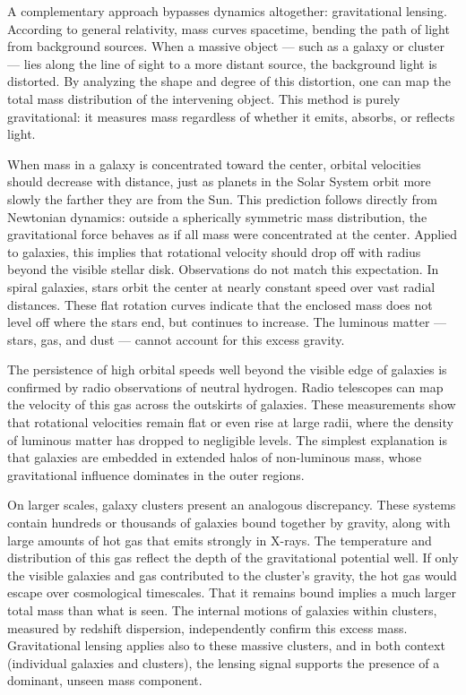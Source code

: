 A complementary approach bypasses dynamics altogether: gravitational lensing. According to general relativity, mass curves spacetime, bending the path of light from background sources. When a massive object — such as a galaxy or cluster — lies along the line of sight to a more distant source, the background light is distorted. By analyzing the shape and degree of this distortion, one can map the total mass distribution of the intervening object. This method is purely gravitational: it measures mass regardless of whether it emits, absorbs, or reflects light.

When mass in a galaxy is concentrated toward the center, orbital velocities should decrease with distance, just as planets in the Solar System orbit more slowly the farther they are from the Sun. This prediction follows directly from Newtonian dynamics: outside a spherically symmetric mass distribution, the gravitational force behaves as if all mass were concentrated at the center. Applied to galaxies, this implies that rotational velocity should drop off with radius beyond the visible stellar disk. Observations do not match this expectation. In spiral galaxies, stars orbit the center at nearly constant speed over vast radial distances. These flat rotation curves indicate that the enclosed mass does not level off where the stars end, but continues to increase. The luminous matter — stars, gas, and dust — cannot account for this excess gravity.

The persistence of high orbital speeds well beyond the visible edge of galaxies is confirmed by radio observations of neutral hydrogen. Radio telescopes can map the velocity of this gas across the outskirts of galaxies. These measurements show that rotational velocities remain flat or even rise at large radii, where the density of luminous matter has dropped to negligible levels. The simplest explanation is that galaxies are embedded in extended halos of non-luminous mass, whose gravitational influence dominates in the outer regions.

On larger scales, galaxy clusters present an analogous discrepancy. These systems contain hundreds or thousands of galaxies bound together by gravity, along with large amounts of hot gas that emits strongly in X-rays. The temperature and distribution of this gas reflect the depth of the gravitational potential well. If only the visible galaxies and gas contributed to the cluster’s gravity, the hot gas would escape over cosmological timescales. That it remains bound implies a much larger total mass than what is seen. The internal motions of galaxies within clusters, measured by redshift dispersion, independently confirm this excess mass. Gravitational lensing applies also to these massive clusters, and in both context (individual galaxies and clusters), the lensing signal supports the presence of a dominant, unseen mass component.

